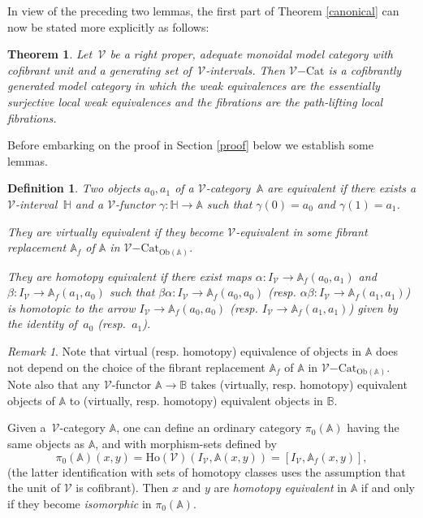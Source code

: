 \documentclass[10pt]{amsart}
\theoremstyle{plain}
\newtheorem{dfn}[subsection]{Definition}
\newtheorem{thm}[subsection]{Theorem}
\theoremstyle{remark}
\newtheorem{rmk}[subsection]{Remark}
\def\Vv{\mathcal{V}}
\def\Cat{\mathrm{Cat}}
\def\VCat{\Vv\mathrm{-}\Cat}
\def\HH{\mathbb{H}}
\def\AA{\mathbb{A}}
\def\BB{\mathbb{B}}
\def\Ob{\mathrm{Ob}}
\def\Ho{\mathrm{Ho}}
\begin{document}
In view of the preceding two lemmas, the first part of Theorem \ref{canonical} can now be stated more explicitly as follows:

\begin{thm}\label{modelstructure}Let $\,\Vv$ be a right proper, adequate monoidal model category with cofibrant unit and a generating set of $\,\Vv$-intervals. Then $\VCat$ is a cofibrantly generated model category in which the weak equivalences are the essentially surjective local weak equivalences and the fibrations are the path-lifting local fibrations.\end{thm}

Before embarking on the proof in Section \ref{proof} below we establish some lemmas.


\begin{dfn}\label{defequivalence}Two objects $a_0,a_1$ of a $\Vv$-category $\,\AA$ are \emph{equivalent} if there exists a $\Vv$-interval $\,\HH$ and a $\Vv$-functor $\gamma:\HH\to\AA$ such that $\gamma(0)=a_0$ and $\gamma(1)=a_1$.

They are \emph{virtually equivalent} if they become $\Vv$-equivalent in some fibrant replacement $\AA_f$ of $\AA$ in $\VCat_{\Ob(\AA)}$.

They are \emph{homotopy equivalent} if there exist maps $\alpha:I_\Vv\to\AA_f(a_0,a_1)$ and $\beta:I_\Vv\to\AA_f(a_1,a_0)$ such that $\beta\alpha:I_\Vv\to\AA_f(a_0,a_0)$ (resp. $\alpha\beta:I_\Vv\to\AA_f(a_1,a_1)$) is homotopic to the arrow $I_\Vv\to\AA_f(a_0,a_0)$ (resp. $I_\Vv\to\AA_f(a_1,a_1)$) given by the identity of $\,a_0$ (resp. $\,a_1$).\end{dfn}

\begin{rmk}\label{pi0}Note that virtual (resp. homotopy) equivalence of objects in $\AA$ does not depend on the choice of the fibrant replacement $\AA_f$ of $\AA$ in $\VCat_{\Ob(\AA)}$. Note also that any $\Vv$-functor $\AA\to\BB$ takes (virtually, resp. homotopy) equivalent objects of $\AA$ to (virtually, resp. homotopy) equivalent objects in $\BB$.

Given a $\,\Vv$-category $\AA$, one can define an ordinary category $\pi_0(\AA)$ having the same objects as $\AA$, and with morphism-sets defined by$$\pi_0(\AA)(x,y)=\Ho(\Vv)(I_\Vv,\AA(x,y))=[I_\Vv,\AA_f(x,y)],$$(the latter identification with sets of homotopy classes uses the assumption that the unit of $\Vv$ is cofibrant). Then $x$ and $y$ are \emph{homotopy equivalent} in $\AA$ if and only if they become \emph{isomorphic} in $\pi_0(\AA)$.\end{rmk}
\end{document}
